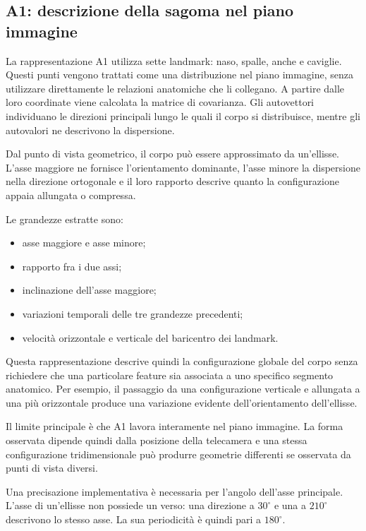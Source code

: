 \subsection{A1: descrizione della sagoma nel piano immagine}

La rappresentazione A1 utilizza sette landmark: naso, spalle, anche e caviglie. Questi punti vengono trattati come una distribuzione nel piano immagine, senza utilizzare direttamente le relazioni anatomiche che li collegano.
A partire dalle loro coordinate viene calcolata la matrice di covarianza. Gli autovettori individuano le direzioni principali lungo le quali il corpo si distribuisce, mentre gli autovalori ne descrivono la dispersione.

Dal punto di vista geometrico, il corpo può essere approssimato da un'ellisse. L'asse maggiore ne fornisce l'orientamento dominante, l'asse minore la dispersione nella direzione ortogonale e il loro rapporto descrive quanto la configurazione appaia allungata o compressa.

Le grandezze estratte sono:
\begin{itemize}
    \item asse maggiore e asse minore;
    \item rapporto fra i due assi;
    \item inclinazione dell'asse maggiore;
    \item variazioni temporali delle tre grandezze precedenti;
    \item velocità orizzontale e verticale del baricentro dei landmark.
\end{itemize}

Questa rappresentazione descrive quindi la configurazione globale del corpo senza richiedere che una particolare feature sia associata a uno specifico segmento anatomico. Per esempio, il passaggio da una configurazione verticale e allungata a una più orizzontale produce una variazione evidente dell'orientamento dell'ellisse.

Il limite principale è che A1 lavora interamente nel piano immagine. La forma osservata dipende quindi dalla posizione della telecamera e una stessa configurazione tridimensionale può produrre geometrie differenti se osservata da punti di vista diversi.

Una precisazione implementativa è necessaria per l'angolo dell'asse principale. L'asse di un'ellisse non possiede un verso: una direzione a \(30^\circ\) e una a \(210^\circ\) descrivono lo stesso asse. La sua periodicità è quindi pari a \(180^\circ\).

